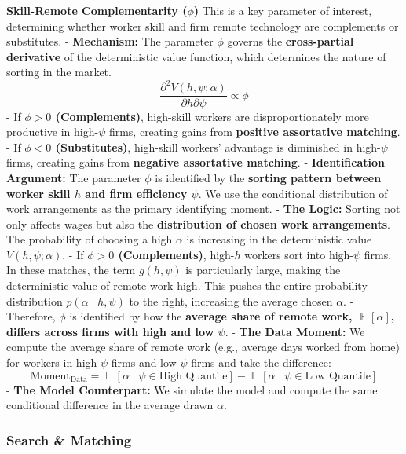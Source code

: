 \documentclass[
  11pt,
  letterpaper,
  DIV=11,
  numbers=noendperiod]{scrartcl}
\DeclareMathOperator*{\Exp}{\mathbb{E}} %
\begin{document}
\textbf{Skill-Remote Complementarity (\(\phi\))} This is a key parameter
of interest, determining whether worker skill and firm remote technology
are complements or substitutes. - \textbf{Mechanism:} The parameter
\(\phi\) governs the \textbf{cross-partial derivative} of the
deterministic value function, which determines the nature of sorting in
the market.
\[ \frac{\partial^2 V(h, \psi; \alpha)}{\partial h \partial \psi} \propto \phi \]
- If \textbf{\(\phi > 0\) (Complements)}, high-skill workers are
disproportionately more productive in high-\(\psi\) firms, creating
gains from \textbf{positive assortative matching}. - If
\textbf{\(\phi < 0\) (Substitutes)}, high-skill workers' advantage is
diminished in high-\(\psi\) firms, creating gains from \textbf{negative
assortative matching}. - \textbf{Identification Argument:} The parameter
\(\phi\) is identified by the \textbf{sorting pattern between worker
skill \(h\) and firm efficiency \(\psi\)}. We use the conditional
distribution of work arrangements as the primary identifying moment. -
\textbf{The Logic:} Sorting not only affects wages but also the
\textbf{distribution of chosen work arrangements}. The probability of
choosing a high \(\alpha\) is increasing in the deterministic value
\(V(h, \psi; \alpha)\). - If \textbf{\(\phi > 0\) (Complements)},
high-\(h\) workers sort into high-\(\psi\) firms. In these matches, the
term \(g(h, \psi)\) is particularly large, making the deterministic
value of remote work high. This pushes the entire probability
distribution \(p(\alpha \mid h,\psi)\) to the right, increasing the
average chosen \(\alpha\). - Therefore, \(\phi\) is identified by how
the \textbf{average share of remote work, \(\Exp[\alpha]\), differs
across firms with high and low \(\psi\)}. - \textbf{The Data Moment:} We
compute the average share of remote work (e.g., average days worked from
home) for workers in high-\(\psi\) firms and low-\(\psi\) firms and take
the difference:
\[\text{Moment}_{\text{Data}} = \Exp[\alpha \mid \psi \in \text{High Quantile}] - \Exp[\alpha \mid \psi \in \text{Low Quantile}]\]
- \textbf{The Model Counterpart:} We simulate the model and compute the
same conditional difference in the average drawn \(\alpha\).

\subsubsection{\texorpdfstring{\textbf{Search \&
Matching}}{Search \& Matching}}\label{search-matching}
\end{document}
